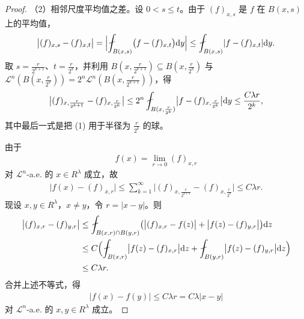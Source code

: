 \documentclass[../../main.tex]{subfiles}%
\begin{document}
\begin{proof}
（2）相邻尺度平均值之差。设 $0<s\le t$。由于 $(f)_{x,s}$ 是 $f$ 在 $B(x,s)$ 上的平均值，
\begin{align*}
\bigl\lvert(f)_{x,s}-(f)_{x,t}\bigr\rvert=\Bigl\lvert\fint_{B(x,s)}\bigl(f-(f)_{x,t}\bigr)\diff y\Bigr\rvert\le\fint_{B(x,s)}\lvert f-(f)_{x,t}\rvert\diff y .
\end{align*}
取 $s=\frac{r}{2^{k+1}}$、$t=\frac{r}{2^k}$，并利用 $B(x,\frac{r}{2^{k+1}})\subseteq B(x,\frac{r}{2^k})$ 与 $\mathcal{L}^n(B(x,\frac{r}{2^k}))=2^n\mathcal{L}^n(B(x,\frac{r}{2^{k+1}}))$，得
\begin{align*}
\bigl\lvert(f)_{x,\frac{r}{2^{k+1}}}-(f)_{x,\frac{r}{2^k}}\bigr\rvert\le2^n\fint_{B(x,\frac{r}{2^k})}\bigl\lvert f-(f)_{x,\frac{r}{2^k}}\bigr\rvert\diff y\le\frac{C\lambda r}{2^k},
\end{align*}
其中最后一式是把 (1) 用于半径为 $\frac{r}{2^k}$ 的球。

由于
\begin{align*}
f(x)=\lim_{r\to0}(f)_{x,r}
\end{align*}
对 $\mathcal{L}^n$-a.e. 的 $x\in R^\lambda$ 成立，故
\begin{align*}
\lvert f(x)-(f)_{x,r}\rvert\le\sum_{k=1}^{\infty}\bigl\lvert(f)_{x,\frac{r}{2^{k+1}}}-(f)_{x,\frac{r}{2^k}}\bigr\rvert\le C\lambda r.
\end{align*}
现设 $x,y\in R^\lambda$，$x\ne y$，令 $r=\lvert x-y\rvert$。则
\begin{align*}
\bigl\lvert(f)_{x,r}-(f)_{y,r}\bigr\rvert
&\le\fint_{B(x,r)\cap B(y,r)}\bigl(\bigl\lvert(f)_{x,r}-f(z)\bigr\rvert+\bigl\lvert f(z)-(f)_{y,r}\bigr\rvert\bigr)\diff z\\
&\le C\Bigl(\fint_{B(x,r)}\bigl\lvert f(z)-(f)_{x,r}\bigr\rvert\diff z+\fint_{B(y,r)}\bigl\lvert f(z)-(f)_{y,r}\bigr\rvert\diff z\Bigr)\\
&\le C\lambda r.
\end{align*}
合并上述不等式，得
\begin{align*}
\lvert f(x)-f(y)\rvert\le C\lambda r=C\lambda\lvert x-y\rvert
\end{align*}
对 $\mathcal{L}^n$-a.e. 的 $x,y\in R^\lambda$ 成立。


\end{proof}
\end{document}
